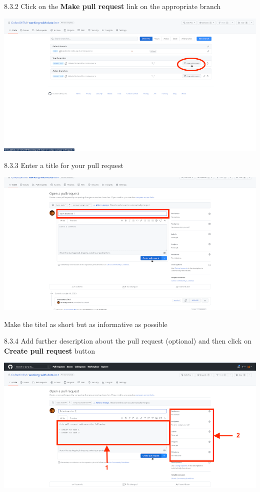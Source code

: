 \documentclass[
  12pt,
]{book}
\begin{document}
8.3.2 Click on the \textbf{Make pull request} link on the appropriate branch

\includegraphics{images/pull_request2.png}

8.3.3 Enter a title for your pull request

\includegraphics{images/pull_request3.png}

Make the titel as short but as informative as possible

8.3.4 Add further description about the pull request (optional) and then click on \textbf{Create pull request} button

\includegraphics{images/pull_request4.png}
\end{document}
